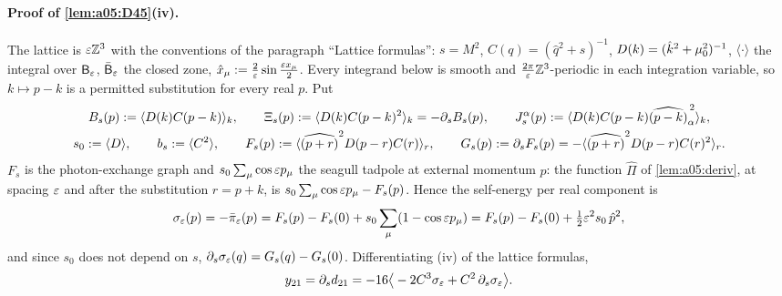 \paragraph{Proof of \cref{lem:a05:D45}(iv).} The lattice is $\varepsilon\mathbb Z^3$ with the conventions of the paragraph ``Lattice formulas'': $s=M^2$, $C(q)=(\hat q^2+s)^{-1}$, $D(k)=(\hat k^2+\mu_0^2)^{-1}$, $\langle\cdot\rangle$ the integral over $\mathsf B_{\varepsilon}$, $\bar{\mathsf B}_{\varepsilon}$ the closed zone, $\hat x_\mu:=\frac2{\varepsilon}\sin\frac{\varepsilon x_\mu}2$. Every integrand below is smooth and $\frac{2\pi}{\varepsilon}\mathbb Z^3$-periodic in each integration variable, so $k\mapsto p-k$ is a permitted substitution for every real $p$. Put
\begin{gather*}
B_s(p):=\langle D(k)C(p-k)\rangle_k,\qquad \Xi_s(p):=\langle D(k)C(p-k)^2\rangle_k=-\partial_sB_s(p),\qquad J^\alpha_s(p):=\langle D(k)C(p-k)\widehat{(p-k)}_\alpha^{\,2}\rangle_k,\\
s_0:=\langle D\rangle,\qquad b_s:=\langle C^2\rangle,\qquad F_s(p):=\langle\widehat{(p+r)}^2D(p-r)C(r)\rangle_r,\qquad G_s(p):=\partial_sF_s(p)=-\langle\widehat{(p+r)}^2D(p-r)C(r)^2\rangle_r .
\end{gather*}
$F_s$ is the photon-exchange graph and $s_0\sum_\mu\cos\varepsilon p_\mu$ the seagull tadpole at external momentum $p$: the function $\hat\Pi$ of \cref{lem:a05:deriv}, at spacing $\varepsilon$ and after the substitution $r=p+k$, is $s_0\sum_\mu\cos\varepsilon p_\mu-F_s(p)$. Hence the self-energy per real component is
\begin{equation}\label{eq:a05:sigeps}
\sigma_{\varepsilon}(p)=-\bar\pi_{\varepsilon}(p)=F_s(p)-F_s(0)+s_0\sum_\mu(1-\cos\varepsilon p_\mu)=F_s(p)-F_s(0)+\tfrac12\varepsilon^2s_0\,\hat p^2 ,
\end{equation}
and since $s_0$ does not depend on $s$, $\partial_s\sigma_{\varepsilon}(q)=G_s(q)-G_s(0)$. Differentiating (iv) of the lattice formulas,
\begin{equation}\label{eq:a05:y21}
y_{21}=\partial_sd_{21}=-16\big\langle-2C^3\sigma_{\varepsilon}+C^2\,\partial_s\sigma_{\varepsilon}\big\rangle .
\end{equation}

